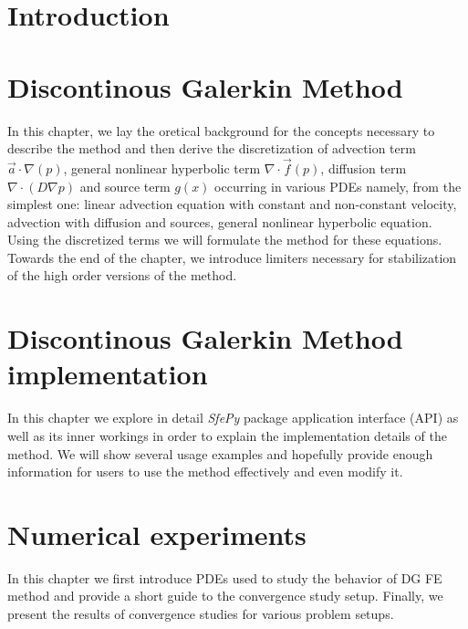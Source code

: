 \documentclass{book}
\providecommand{\sfepy}{\textit{SfePy}}
\theoremstyle{definition}
\numberwithin{equation}{section}
\numberwithin{table}{section}
\begin{document}
\chapter{Introduction}
\label{ch:introduction}


\chapter{Discontinous Galerkin Method}
\label{ch:theory}
In this chapter, we lay the oretical background for the concepts necessary to 
describe the method and then derive the discretization of advection term 
$\vec{a}\cdot\nabla(p)$, general nonlinear hyperbolic term $\nabla\cdot 
\vec{f}(p)$, diffusion term $\nabla \cdot (D \nabla p)$ and source term $g(x)$ 
occurring in various PDEs namely, from the simplest one: linear advection 
equation with constant and non-constant velocity, advection with diffusion and 
sources, general nonlinear hyperbolic equation. Using the discretized terms we 
will formulate the method for these equations. Towards the end of the chapter, 
we introduce limiters necessary for stabilization of the high order versions 
of the method.



\chapter{Discontinous Galerkin Method implementation}
\label{ch:implementation}
In this chapter we explore in detail \sfepy{} package application interface 
(API) as well as its inner workings in order to explain the implementation 
details of the method. We will show several usage examples and hopefully 
provide enough information for users to use the method effectively and even 
modify it.



\chapter{Numerical experiments}
\label{ch:convergence}
In this chapter we first introduce PDEs used to study the behavior of DG FE 
method and provide a short guide to the convergence study setup. Finally, we 
present the results of convergence studies for various problem setups.


\newpage

\newpage

\newpage

\newpage

\newpage

\newpage

\newpage

\newpage

\end{document}
